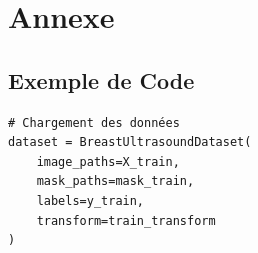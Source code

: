 \documentclass[a4paper,12pt]{article}
\begin{document}
\section*{Annexe}
\subsection*{Exemple de Code}
\begin{verbatim}
# Chargement des données
dataset = BreastUltrasoundDataset(
    image_paths=X_train,
    mask_paths=mask_train,
    labels=y_train,
    transform=train_transform
)
\end{verbatim}



\end{document}
